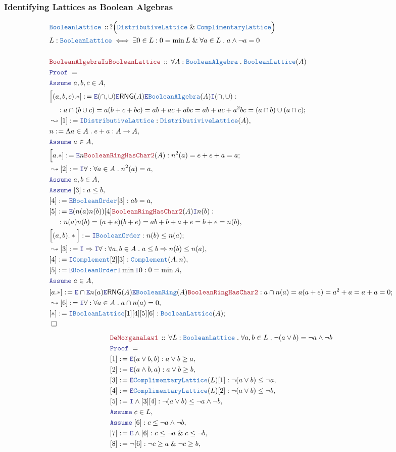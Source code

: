\documentclass[12pt]{scrartcl}
\newcommand{\TYPE}[1]{\textcolor{NavyBlue}{\mathtt{#1}}}
\newcommand{\LOGIC}[1]{\textcolor{Blue}{\mathtt{#1}}}
\newcommand{\THM}[1]{\textcolor{Maroon}{\mathtt{#1}}}
\renewcommand{\.}{\; . \;}
\newcommand{\de}{: \kern 0.1pc =}
\newcommand{\Theorem}[2]{& \THM{#1} \, :: \, #2 \\ & \Proof = \\ }
\newcommand{\DeclareType}[2]{& \TYPE{#1} \, :: \, #2 \\}
\newcommand{\DefineType}[3]{& #1 : \TYPE{#2} \iff #3 \\}
\newcommand{\NewLine}{\\ & \kern 1pc}
\newcommand{\Page}[1]{ \begin{align*} #1 \end{align*}   }
\renewcommand{\And}{\; \& \;}
\newcommand{\Imply}{\Rightarrow}
\newcommand{\Intro}{\LOGIC{I}}
\newcommand{\Elim}{\LOGIC{E}}
\newcommand{\Say}[3]{& #1 \de #2 : #3, \\}
\newcommand{\Conclude}[3]{& #1 \de #2 : #3; \\}
\newcommand{\Derive}[3]{& \leadsto #1 \de #2 : #3, \\}
\newcommand{\Assume}[2]{& \LOGIC{Assume} \; #1 : #2, \\}
\newcommand{\AssumeIn}[2]{& \LOGIC{Assume} \; #1 \in #2, \\}
\newcommand{\QED}{\; \square}
\newcommand{\EndProof}{& \QED \\}
\newcommand{\Proof}{\LOGIC{Proof} \; }
\newcommand{\RNG}{\mathsf{RNG}}
\newcommand{\BR}{\TYPE{BooleanRing}}
\newcommand{\BA}{\TYPE{BooleanAlgebra}}
\newcommand{\BL}{\TYPE{BooleanLattice}}
\begin{document}
\subsubsection{Identifying  Lattices as Boolean Algebras}
\Page{
	\DeclareType{\BL}{? \Big(\TYPE{DistributiveLattice} \And \TYPE{ComplimentaryLattice}\Big)}
	\DefineType{L}{\BL}{\exists 0 \in L :  0 = \min L \And \forall a \in L \. a \wedge \neg a = 0}
	\\
	\Theorem{BooleanAlgebraIsBooleanLattice}{\forall A : \BA \. \BL(A)}
	\AssumeIn{a,b,c}{A}
	\Conclude{\Big[(a,b,c).*]}{\Elim (\cap,\cup) \Elim \RNG(A) \Elim \BA(A) \Intro (\cap,\cup)}
	{
		\NewLine :
		a \cap (b \cup c) = 
		a ( b + c + bc) = 
		ab + ac + abc =
		ab + ac + a^2 bc =
		(a \cap b) \cup (a \cap c)
	}
	\Derive{[1]}{\Intro \TYPE{DistributiveLattice}}
	{
		\TYPE{DistributiviveLattice}(A)
	}
	\Say{n}{\Lambda a \in A \. e + a}{A \to A}
	\AssumeIn{a}{A}
	\Conclude{\Big[a.*]}{\Elim n \THM{BooleanRingHasChar2}(A)}
	{
		n^2(a) = e + e + a = a
	}
	\Derive{[2]}{\Intro \forall}{\forall a \in A \. n^2(a) = a}
	\AssumeIn{a,b}{A}
	\Assume{[3]}{a \le b}
	\Say{[4]}{\Elim \TYPE{BooleanOrder}[3]}{ ab = a  }
	\Say{[5]}{\Elim(n(a)n(b)) [4] \THM{BooleanRingHasChar2}(A) \Intro n(b)   }
	{
		\NewLine :
		n(a)n(b) = 
		(a + e)(b + e) = 
		ab + b + a + e =
		b + e = 
		n(b)
	}
	\Conclude{\Big[(a,b).*\Big]}{\Intro \TYPE{BooleanOrder}}{n(b) \le n(a)}
	\Derive{[3]}{\Intro \Imply\Intro \forall}
	{
		\forall a,b \in A \.
		a \le b \Imply n(b) \le n(a)
	}
	\Say{[4]}{\Intro \TYPE{Complement}[2][3]}
	{
		\TYPE{Complement}(A,n)
	}
	\Say{[5]}{\Elim \TYPE{BooleanOrder}\Intro \min \Intro 0}{0 = \min A}
	\AssumeIn{a}{A}
	\Conclude{[a.*]}{\Elim \cap \Elim n(a) \Elim \RNG(A) \Elim \BR(A) \THM{BooleanRingHasChar2}}
	{
		a \cap n(a) = 
		a(a + e) = 
		a^2 + a  =
		a + a =
		0
	}
	\Derive{[6]}{\Intro \forall}
	{
		\forall a \in A \. 
		a \cap n(a) = 0
	}
	\Conclude{[*]}{\Intro \BL [1][4][5][6]}{\BL(A)}
	\EndProof
}\Page{
	\Theorem{DeMorganaLaw1}
	{
		\forall L : \BL \.
		\forall a,b \in L \.
		\neg(a \vee b) =  \neg a \wedge \neg b
	}
	\Say{[1]}{\Elim(a \vee b,b)}
	{
		a \vee b \ge a
	}
	\Say{[2]}{\Elim(a \wedge b,a)}
	{
		a \vee b \ge b
	}
	\Say{[3]}{\Elim \TYPE{ComplimentaryLattice}(L)[1]}
	{
	  	\neg(a \vee b) \le \neg a
	}
	\Say{[4]}{\Elim \TYPE{ComplimentaryLattice}(L)[2]}
	{
	  	\neg(a \vee b) \le \neg b
	}
	\Say{[5]}{\Intro \wedge [3][4]}{\neg(a \vee b) \le \neg a \wedge \neg b}
	\AssumeIn{c}{L}
	\Assume{[6]}{c \le \neg a \wedge \neg b}
	\Say{[7]}{\Elim \wedge [6]}{ c \le \neg a \And c \le \neg b }
	\Say{[8]}{\neg [6]}{ \neg c \ge a \And \neg c \ge b }
}
\end{document}
